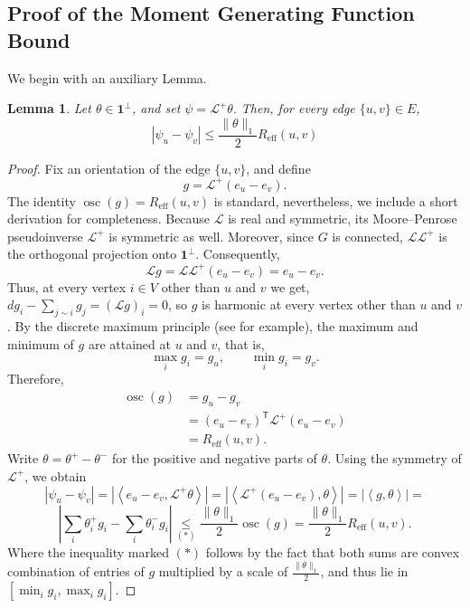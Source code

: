 \documentclass[11pt]{article}
\numberwithin{equation}{section}
\newtheorem{lemma}[theorem]{Lemma}
\newcommand{\1}{\mathbf{1}}
\newcommand{\ip}[2]{\left\langle #1,#2\right\rangle}
\begin{document}
\subsection{Proof of the Moment Generating Function Bound}\label{sec:MGFBound}

We begin with an auxiliary Lemma.

\begin{lemma}
\label{lem:voltage-bound}
Let \(\theta\in \mathbf 1^{\perp}\), and set \(\psi=\mathcal L^+\theta.\)
Then, for every edge \(\{u,v\}\in E\),
\[
|\psi_u-\psi_v|
\le
\frac{\|\theta\|_1}{2}R_{\mathrm{eff}}(u,v)
\]
\end{lemma}

\begin{proof}
Fix an orientation of the edge \(\{u,v\}\), and define
\[
g
=
\mathcal L^+(e_u-e_v).
\]
The identity \(\operatorname{osc}(g)=R_{\mathrm{eff}}(u,v)\) is standard, nevertheless, we include a short derivation for completeness.
 Because \(\mathcal L\) is real and symmetric, its Moore--Penrose pseudoinverse \(\mathcal L^+\) is symmetric as well. Moreover, since \(G\) is connected, \(\mathcal L\mathcal L^+\) is the orthogonal projection onto \(\1^\perp\). Consequently,
\[
\mathcal Lg
=
\mathcal L\mathcal L^+(e_u-e_v)
=
e_u-e_v.
\]
Thus, at every vertex $i \in V$ other than $u$ and $v$ we get, \(dg_i - \sum_{j\sim i} g_j = (\mathcal L g)_i = 0\), so \(g\) is harmonic at every vertex other than \(u\) and \(v\). 
By the discrete maximum principle (see \cite[Chapter 2]{LyonsPeres} for example), the maximum and minimum of \(g\) are attained at \(u\) and \(v\), that is,
\[
\max_i g_i=g_u,
\qquad
\min_i g_i=g_v.
\]
Therefore,
\[
\begin{aligned}
\operatorname{osc}(g)
&=
g_u-g_v\\
&=
(e_u-e_v)^{\mathsf T}
\mathcal L^+
(e_u-e_v)\\
&=
R_{\mathrm{eff}}(u,v).
\end{aligned}
\]
Write \(\theta=\theta^+-\theta^-\) for the positive and negative parts of \(\theta\). Using the symmetry of \(\mathcal L^+\), we obtain
\[
|\psi_u-\psi_v|
=
|\ip{e_u-e_v}{\mathcal L^+\theta}|=
|\ip{\mathcal L^+(e_u-e_v)}{\theta}|=
|\ip{g}{\theta}|=
\]
\[ 
\left|\sum_i\theta_i^+g_i-\sum_i\theta_i^-g_i\right| \underset{(*)}{\le}
\frac{\|\theta\|_1}{2}\operatorname{osc}(g)=
 \frac{\|\theta\|_1}{2}R_{\mathrm{eff}}(u,v).
\]
Where the inequality marked $(*)$ follows by the fact that both sums are convex combination of entries of $g$ multiplied by a scale of $\frac{\|\theta\|_1}{2}$, and thus lie in $[\min_i g_i , \max_i g_i].$
\end{proof}
\end{document}

